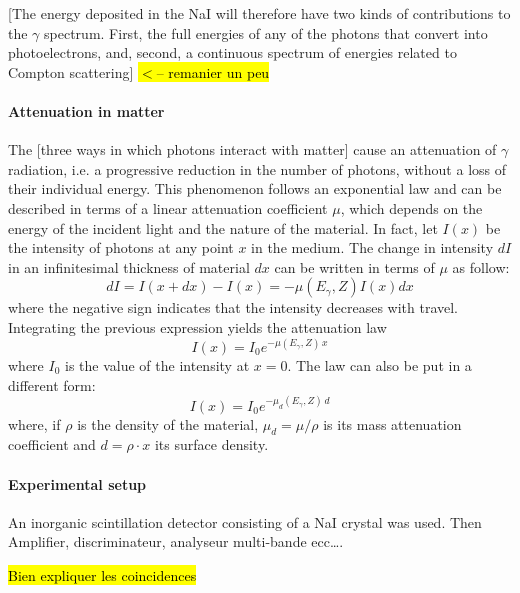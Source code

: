[The energy deposited in the NaI will therefore have two kinds of contributions to the $\gamma$ spectrum.
First, the full energies of any of the photons that convert into photoelectrons, and, second, a continuous spectrum of energies related to Compton scattering] \hl{$<$-- remanier un peu}

\paragraph{Attenuation in matter}
The [three ways in which photons interact with matter] cause an attenuation of $\gamma$ radiation, i.e. a progressive reduction in the number of photons, without a loss of their individual energy.
This phenomenon follows an exponential law and can be described in terms of a linear attenuation coefficient $\mu$, which depends on the energy of the incident light and the nature of the material.
In fact, let $I(x)$ be the intensity of photons at any point $x$ in the medium.
The change in intensity $dI$ in an infinitesimal thickness of material $dx$ can be written in terms of $\mu$ as follow:
\begin{equation}
    dI = I(x + dx) - I(x) = -\mu(E_{\gamma}, Z) I(x) dx
\end{equation}
where the negative sign indicates that the intensity decreases with travel.
Integrating the previous expression yields the attenuation law
\begin{equation} \label{eq:attenuation_law}
    I(x) = I_0 e^{-\mu(E_{\gamma}, Z) \, x}
\end{equation}
where $I_0$ is the value of the intensity at $x=0$. 
The law can also be put in a different form:
\begin{equation} \label{eq:attenuation_law_density}
    I(x) = I_0 e^{-\mu_d(E_{\gamma}, Z) \, d}
\end{equation}
where, if $\rho$ is the density of the material, $\mu_d = \mu / \rho$ is its mass attenuation coefficient and $d = \rho \cdot x$ its surface density.

\paragraph{Experimental setup}
An inorganic scintillation detector consisting of a NaI crystal was used.
Then Amplifier, discriminateur, analyseur  multi-bande ecc\dots.

\hl{Bien expliquer les coincidences}

